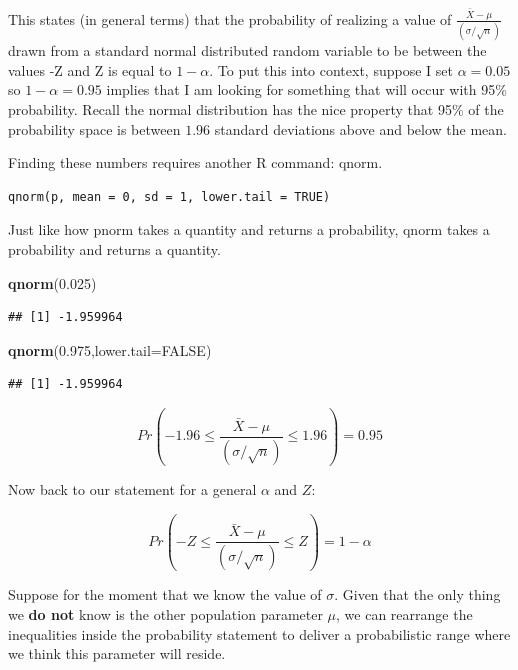 \documentclass[
]{book}
\newenvironment{Shaded}{\begin{snugshade}}{\end{snugshade}}
\newcommand{\AttributeTok}[1]{\textcolor[rgb]{0.13,0.29,0.53}{#1}}
\newcommand{\ConstantTok}[1]{\textcolor[rgb]{0.56,0.35,0.01}{#1}}
\newcommand{\FloatTok}[1]{\textcolor[rgb]{0.00,0.00,0.81}{#1}}
\newcommand{\FunctionTok}[1]{\textcolor[rgb]{0.13,0.29,0.53}{\textbf{#1}}}
\newcommand{\NormalTok}[1]{#1}
\begin{document}
This states (in general terms) that the probability of realizing a value of \(\frac{\bar{X}-\mu}{(\sigma/\sqrt{n})}\) drawn from a standard normal distributed random variable to be between the values -Z and Z is equal to \(1-\alpha\). To put this into context, suppose I set \(\alpha=0.05\) so \(1-\alpha=0.95\) implies that I am looking for something that will occur with 95\% probability. Recall the normal distribution has the nice property that 95\% of the probability space is between \(1.96\) standard deviations above and below the mean.

Finding these numbers requires another R command: qnorm.

\begin{verbatim}
qnorm(p, mean = 0, sd = 1, lower.tail = TRUE)
\end{verbatim}

Just like how pnorm takes a quantity and returns a probability, qnorm takes a probability and returns a quantity.

\begin{Shaded}
\begin{Highlighting}[]
\FunctionTok{qnorm}\NormalTok{(}\FloatTok{0.025}\NormalTok{)}
\end{Highlighting}
\end{Shaded}

\begin{verbatim}
## [1] -1.959964
\end{verbatim}

\begin{Shaded}
\begin{Highlighting}[]
\FunctionTok{qnorm}\NormalTok{(}\FloatTok{0.975}\NormalTok{,}\AttributeTok{lower.tail=}\ConstantTok{FALSE}\NormalTok{)}
\end{Highlighting}
\end{Shaded}

\begin{verbatim}
## [1] -1.959964
\end{verbatim}

\[Pr\left(-1.96 \leq \frac{\bar{X}-\mu}{(\sigma/\sqrt{n})} \leq 1.96\right)=0.95\]

Now back to our statement for a general \(\alpha\) and \(Z\):

\[Pr\left(-Z \leq \frac{\bar{X}-\mu}{(\sigma/\sqrt{n})} \leq Z\right)=1-\alpha\]

Suppose for the moment that we know the value of \(\sigma\). Given that the only thing we \textbf{do not} know is the other population parameter \(\mu\), we can rearrange the inequalities inside the probability statement to deliver a probabilistic range where we think this parameter will reside.
\end{document}

